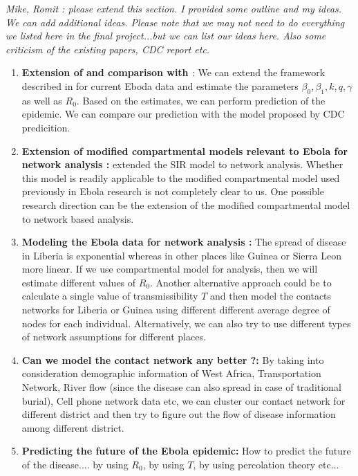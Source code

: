 \documentclass[12pt, journal,onecolumn]{IEEEtran}
\begin{document}
\bigskip
{\em{Mike, Romit : please extend this section. I provided some outline and my ideas. We can add additional ideas. Please note that we may not need to do everything we listed here in the final project...but we can list our ideas here. Also some criticism of the existing papers, CDC report etc.}}


\begin{enumerate}
\item \textbf{Extension of \cite{chowell2004basic} and comparison with \cite{meltzer2014estimating}}: We can extend the framework described in \cite{chowell2004basic} for current Eboda data and estimate the parameters $\beta_0, \beta_1, k, q, \gamma$ as well as $R_0$. Based on the estimates, we can perform prediction of the epidemic. We can compare our prediction with the model proposed by CDC \cite{meltzer2014estimating} predicition.

\item \textbf{Extension of modified compartmental models relevant to Ebola for network analysis : } \cite{newman2002spread, meyers2005network} extended the SIR model to network analysis. Whether this model is readily applicable to the modified compartmental model used previously in Ebola research \cite{chowell2004basic, legrand2007understanding} is not completely clear to us. One possible research direction can be the extension of the modified compartmental model to network based analysis.

\item \textbf{Modeling the Ebola data for network analysis : } The spread of disease in Liberia is exponential whereas in other places like Guinea or Sierra Leon more linear. If we use compartmental model for analysis, then we will estimate different values of $R_0$. Another alternative approach could be to calculate a single value of transmissibility $T$ and then model the contacts networks for Liberia or Guinea using different different average degree of nodes for each individual. Alternatively, we can also try to use different types of network assumptions for different places.

\item \textbf{Can we model the contact network any better ?:} By taking into consideration demographic information of West Africa, Transportation Network, River flow (since the disease can also spread in case of traditional burial), Cell phone network data etc, we can cluster our contact network  for different district and then try to figure out the flow of disease information among different district.

\item \textbf{Predicting the future of the Ebola epidemic: } How to predict the future of the disease.... by using $R_0$, by using $T$, by using percolation theory etc...



\end{enumerate}
\end{document}
